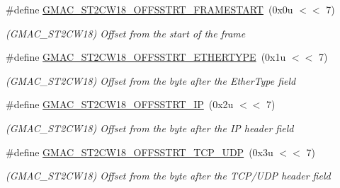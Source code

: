 \begin{DoxyCompactItemize}
\item 
\mbox{\label{group__SAME70__GMAC_gaee334d28e3ad0cec00ba2a9e506051cd}} 
\#define \mbox{\hyperlink{group__SAME70__GMAC_gaee334d28e3ad0cec00ba2a9e506051cd}{G\+M\+A\+C\+\_\+\+S\+T2\+C\+W18\+\_\+\+O\+F\+F\+S\+S\+T\+R\+T\+\_\+\+F\+R\+A\+M\+E\+S\+T\+A\+RT}}~(0x0u $<$$<$ 7)
\begin{DoxyCompactList}\small\item\em (G\+M\+A\+C\+\_\+\+S\+T2\+C\+W18) Offset from the start of the frame \end{DoxyCompactList}\item 
\mbox{\label{group__SAME70__GMAC_gaf1bf614eef0150068fe30214f05c545e}} 
\#define \mbox{\hyperlink{group__SAME70__GMAC_gaf1bf614eef0150068fe30214f05c545e}{G\+M\+A\+C\+\_\+\+S\+T2\+C\+W18\+\_\+\+O\+F\+F\+S\+S\+T\+R\+T\+\_\+\+E\+T\+H\+E\+R\+T\+Y\+PE}}~(0x1u $<$$<$ 7)
\begin{DoxyCompactList}\small\item\em (G\+M\+A\+C\+\_\+\+S\+T2\+C\+W18) Offset from the byte after the Ether\+Type field \end{DoxyCompactList}\item 
\mbox{\label{group__SAME70__GMAC_ga40b1bf76a1a1c980049ed299da2ce3af}} 
\#define \mbox{\hyperlink{group__SAME70__GMAC_ga40b1bf76a1a1c980049ed299da2ce3af}{G\+M\+A\+C\+\_\+\+S\+T2\+C\+W18\+\_\+\+O\+F\+F\+S\+S\+T\+R\+T\+\_\+\+IP}}~(0x2u $<$$<$ 7)
\begin{DoxyCompactList}\small\item\em (G\+M\+A\+C\+\_\+\+S\+T2\+C\+W18) Offset from the byte after the IP header field \end{DoxyCompactList}\item 
\mbox{\label{group__SAME70__GMAC_ga373f77af987ad6517f4d26c37ccfbcc4}} 
\#define \mbox{\hyperlink{group__SAME70__GMAC_ga373f77af987ad6517f4d26c37ccfbcc4}{G\+M\+A\+C\+\_\+\+S\+T2\+C\+W18\+\_\+\+O\+F\+F\+S\+S\+T\+R\+T\+\_\+\+T\+C\+P\+\_\+\+U\+DP}}~(0x3u $<$$<$ 7)
\begin{DoxyCompactList}\small\item\em (G\+M\+A\+C\+\_\+\+S\+T2\+C\+W18) Offset from the byte after the T\+C\+P/\+U\+DP header field \end{DoxyCompactList}\item 
\mbox{\label{group__SAME70__GMAC_ga4ce50d60a21c71b56a02a2ae9022b183}} 

\end{DoxyCompactItemize}
